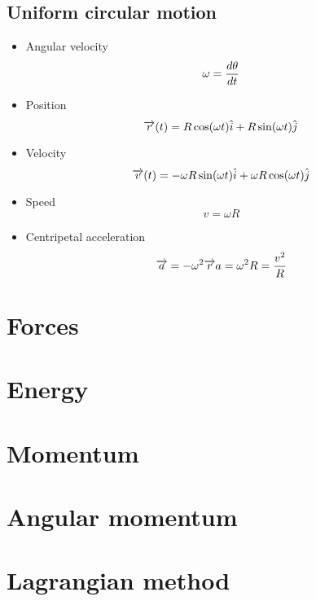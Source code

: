     \subsection{Uniform circular motion}
        \begin{itemize}
            \item Angular velocity
                \begin{equation}
                    \omega=\dfrac{d\theta}{dt}
                \end{equation}
            \item Position
                \begin{equation}
                    \overrightarrow{r}(t) = R\cos(\omega t)\hat{i}+R\sin(\omega t) \hat{j}
                \end{equation}
            \item Velocity
                \begin{equation}
                    \overrightarrow{v}(t)=-\omega R\sin(\omega t)\hat{i}+\omega R\cos(\omega t)\hat{j}
                \end{equation}
            \item Speed
                \begin{equation}
                    v=\omega R
                \end{equation}
            \item Centripetal acceleration
                \begin{equation}
                    \overrightarrow{a}=-\omega^2\overrightarrow{r} \\
                    a=\omega^2R=\frac{v^2}{R}
                \end{equation}
        \end{itemize}
\section{Forces}
\section{Energy}
\section{Momentum}
\section{Angular momentum}
\section{Lagrangian method}
